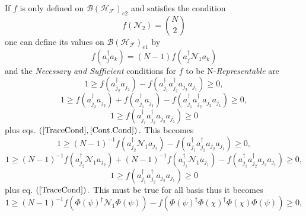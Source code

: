 \documentclass[aps,preprint]{revtex4}%
\begin{document}
If $f$ is only defined on $\mathcal{B}\left(  \mathcal{H}_{\mathcal{F}%
}\right)  _{e2}$ and satisfies the condition
\begin{equation}
f\left(  \mathcal{N}_{2}\right)  =\binom{N}{2} \label{TraceCond}%
\end{equation}
one can define its values on $\mathcal{B}\left(  \mathcal{H}_{\mathcal{F}%
}\right)  _{e1}$ by
\begin{equation}
f\left(  a_{j}^{\dagger}a_{k}\right)  =\left(  N-1\right)  f\left(
a_{j}^{\dagger}\mathcal{N}_{1}a_{k}\right)  \label{Cont.Cond}%
\end{equation}
and the \emph{Necessary and Sufficient} conditions for $f$ to be
N-\emph{Representable }are \emph{ }%
\begin{equation}
1\geq f\left(  a_{j_{2}}^{\dagger}a_{j_{2}}\right)  -f\left(  a_{j_{1}%
}^{\dagger}a_{j_{2}}^{\dagger}a_{j_{2}}a_{j_{1}}\right)  \geq0,
\end{equation}%
\begin{equation}
1\geq f\left(  a_{j_{2}}^{\dagger}a_{j_{2}}\right)  +f\left(  a_{j_{1}%
}^{\dagger}a_{j_{1}}\right)  -f\left(  a_{j_{1}}^{\dagger}a_{j_{2}}^{\dagger
}a_{j_{2}}a_{j_{1}}\right)  \geq0,
\end{equation}%
\begin{equation}
1\geq f\left(  a_{j_{1}}^{\dagger}a_{j_{2}}^{\dagger}a_{j_{2}}a_{j_{1}%
}\right)  \geq0
\end{equation}
plus eqs. $\left(  \ref{TraceCond},\ref{Cont.Cond}\right)  .$ This becomes
\begin{equation}
1\geq\left(  N-1\right)  ^{-1}f\left(  a_{j_{2}}^{\dagger}\mathcal{N}%
_{1}a_{j_{2}}\right)  -f\left(  a_{j_{1}}^{\dagger}a_{j_{2}}^{\dagger}%
a_{j_{2}}a_{j_{1}}\right)  \geq0,
\end{equation}%
\begin{equation}
1\geq\left(  N-1\right)  ^{-1}f\left(  a_{j_{2}}^{\dagger}\mathcal{N}%
_{1}a_{j_{2}}\right)  +\left(  N-1\right)  ^{-1}f\left(  a_{j_{1}}^{\dagger
}\mathcal{N}_{1}a_{j_{1}}\right)  -f\left(  a_{j_{1}}^{\dagger}a_{j_{2}%
}^{\dagger}a_{j_{2}}a_{j_{1}}\right)  \geq0,
\end{equation}%
\begin{equation}
1\geq f\left(  a_{j_{1}}^{\dagger}a_{j_{2}}^{\dagger}a_{j_{2}}a_{j_{1}%
}\right)  \geq0
\end{equation}
plus eq. $\left(  \ref{TraceCond}\right)  .$ This must be true for all basis
thus it becomes
\begin{equation}
1\geq\left(  N-1\right)  ^{-1}f\left(  \Phi\left(  \psi\right)  ^{\dagger
}\mathcal{N}_{1}\Phi\left(  \psi\right)  \right)  -f\left(  \Phi\left(
\psi\right)  ^{\dagger}\Phi\left(  \chi\right)  ^{\dagger}\Phi\left(
\chi\right)  \Phi\left(  \psi\right)  \right)  \geq0,
\end{equation}%
\end{document}
